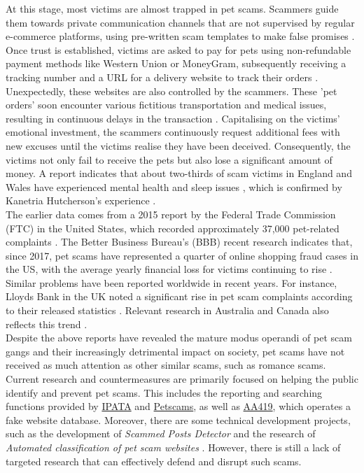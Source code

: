 \documentclass[ oneside,%
                    author={Cassie Qing Tang},
                    degree={BSc},
                     title={An Automated Response System for Disrupting Online Pet Scamming \\ },
                    subtitle={ }]{dissertation}
\begin{document}
At this stage, most victims are almost trapped in pet scams. Scammers guide them towards private communication channels that are not supervised by regular e-commerce platforms, using pre-written scam templates to make false promises \cite{ipata_current_nodate}. Once trust is established, victims are asked to pay for pets using non-refundable payment methods like Western Union or MoneyGram, subsequently receiving a tracking number and a URL for a delivery website to track their orders \cite{price_resource_2020}. Unexpectedly, these websites are also controlled by the scammers. These 'pet orders' soon encounter various fictitious transportation and medical issues, resulting in continuous delays in the transaction \cite{price_resource_2020}. Capitalising on the victims' emotional investment, the scammers continuously request additional fees with new excuses until the victims realise they have been deceived. Consequently, the victims not only fail to receive the pets but also lose a significant amount of money. A report indicates that about two-thirds of scam victims in England and Wales have experienced mental health and sleep issues \cite{shaw_report_2024}, which is confirmed by Kanetria Hutcherson's experience \cite{better_business_bureau_bbb_2017}.
\\

The earlier data comes from a 2015 report by the Federal Trade Commission (FTC) in the United States, which recorded approximately 37,000 pet-related complaints \cite{better_business_bureau_bbb_2017}. The Better Business Bureau's (BBB) recent research indicates that, since 2017, pet scams have represented a quarter of online shopping fraud cases in the US, with the average yearly financial loss for victims continuing to rise \cite{better_business_bureau_bbb_2022}. Similar problems have been reported worldwide in recent years. For instance, Lloyds Bank in the UK noted a significant rise in pet scam complaints according to their released statistics \cite{lloyds_bank_fraudsters_2023}. Relevant research in Australia and Canada also reflects this trend \cite{better_business_bureau_bbb_2017}.
\\

Despite the above reports have revealed the mature modus operandi of pet scam gangs and their increasingly detrimental impact on society, pet scams have not received as much attention as other similar scams, such as romance scams. Current research and countermeasures are primarily focused on helping the public identify and prevent pet scams. This includes the reporting and searching functions provided by \href{https://www.ipata.org/pet-scams}{IPATA} and \href{www.petscams.com}{Petscams}, as well as \href{www.aa419.org}{AA419}, which operates a fake website database. Moreover, there are some technical development projects, such as the development of \textit{Scammed Posts Detector} \cite{norazman_development_2014} and the research of \textit{Automated classification of pet scam websites} \cite{mehmedov_automated_2021}. However, there is still a lack of targeted research that can effectively defend and disrupt such scams.
\\
\end{document}
